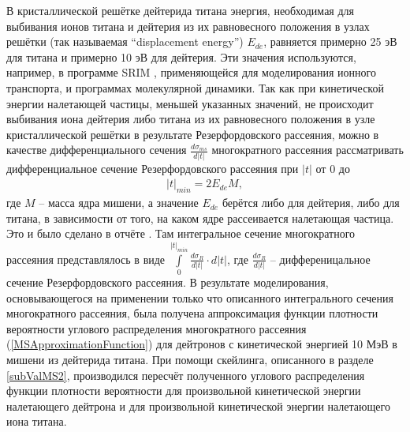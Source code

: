 \documentclass[a4paper,12pt]{article}
\begin{document}
\begin{large}
	
	В кристаллической решётке дейтерида титана энергия, необходимая для выбивания ионов титана и дейтерия из их равновесного положения в узлах решётки (так называемая ``displacement energy'') $E_{de}$, равняется примерно 25 эВ для титана и примерно 10 эВ для дейтерия.
  	Эти значения используются, например, в программе SRIM \cite{SRIM}, применяющейся для моделирования ионного транспорта, и программах молекулярной динамики.
  	Так как при кинетической энергии налетающей частицы, меньшей указанных значений, не происходит выбивания иона дейтерия либо титана из их равновесного положения в узле кристаллической решётки в результате Резерфордовского рассеяния, можно в качестве дифференциального сечения $\frac{d\sigma_{ms}}{d|t|}$ многократного рассеяния рассматривать дифференциальное сечение Резерфордовского рассеяния при $|t|$ от 0 до
\begin{equation}
\begin{aligned} 
 \label{Tmin}  
    |t|_{min}=2E_{de}M,
\end{aligned}
\end{equation}
	где $M$ -- масса ядра мишени, а значение $E_{de}$ берётся либо для дейтерия, либо для титана, в зависимости от того, на каком ядре рассеивается налетающая частица.
	Это и было сделано в отчёте \cite{70/778-T}.
	Там интегральное сечение многократного рассеяния представлялось в виде $\int \limits_0^{|t|_{min}} \frac{d\sigma_R}{d|t|} \cdot d|t|$, где $\frac{d\sigma_R}{d|t|}$ -- дифференицальное сечение Резерфордовского рассеяния.
	В результате моделирования, основывающегося на применении только что описанного интегрального сечения многократного рассеяния, была получена аппроксимация функции плотности вероятности углового распределения многократного рассеяния (\ref{MSApproximationFunction}) для дейтронов с кинетической энергией 10 МэВ в мишени из дейтерида титана.
	При помощи скейлинга, описанного в разделе \ref{subValMS2}, производился пересчёт полученного углового распределения функции плотности вероятности для произвольной кинетической энергии налетающего дейтрона и для произвольной кинетической энергии налетающего иона титана.
	

\end{large}
\end{document}
